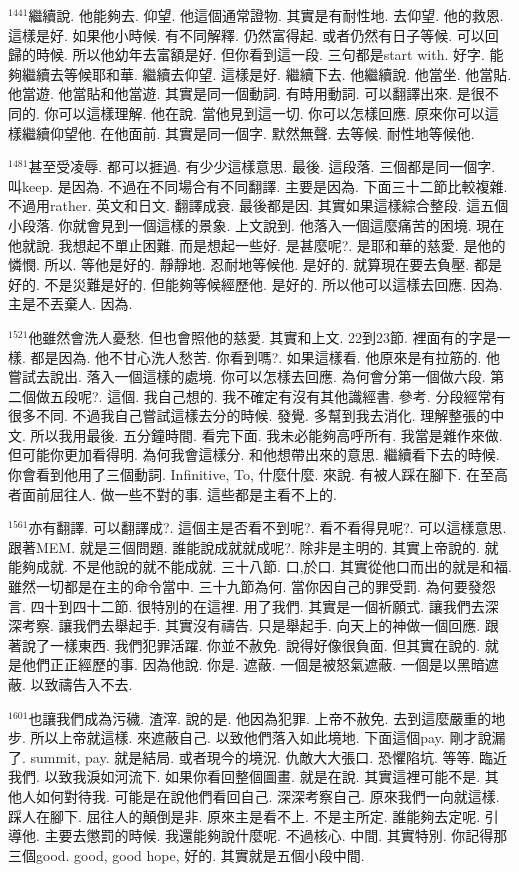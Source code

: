 \documentclass{book}
\begin{document}
$^{1441}$繼續說.
他能夠去.
仰望.
他這個通常證物.
其實是有耐性地.
去仰望.
他的救恩.
這樣是好.
如果他小時候.
有不同解釋.
仍然富得起.
或者仍然有日子等候.
可以回歸的時候.
所以他幼年去富額是好.
但你看到這一段.
三句都是start with.
好字.
能夠繼續去等候耶和華.
繼續去仰望.
這樣是好.
繼續下去.
他繼續說.
他當坐.
他當貼.
他當遊.
他當貼和他當遊.
其實是同一個動詞.
有時用動詞.
可以翻譯出來.
是很不同的.
你可以這樣理解.
他在說.
當他見到這一切.
你可以怎樣回應.
原來你可以這樣繼續仰望他.
在他面前.
其實是同一個字.
默然無聲.
去等候.
耐性地等候他.

$^{1481}$甚至受凌辱.
都可以捱過.
有少少這樣意思.
最後.
這段落.
三個都是同一個字.
叫keep.
是因為.
不過在不同場合有不同翻譯.
主要是因為.
下面三十二節比較複雜.
不過用rather.
英文和日文.
翻譯成衰.
最後都是因.
其實如果這樣綜合整段.
這五個小段落.
你就會見到一個這樣的景象.
上文說到.
他落入一個這麼痛苦的困境.
現在他就說.
我想起不單止困難.
而是想起一些好.
是甚麼呢?.
是耶和華的慈愛.
是他的憐憫.
所以.
等他是好的.
靜靜地.
忍耐地等候他.
是好的.
就算現在要去負壓.
都是好的.
不是災難是好的.
但能夠等候經歷他.
是好的.
所以他可以這樣去回應.
因為.
主是不丟棄人.
因為.

$^{1521}$他雖然會洗人憂愁.
但也會照他的慈愛.
其實和上文.
22到23節.
裡面有的字是一樣.
都是因為.
他不甘心洗人愁苦.
你看到嗎?.
如果這樣看.
他原來是有拉筋的.
他嘗試去說出.
落入一個這樣的處境.
你可以怎樣去回應.
為何會分第一個做六段.
第二個做五段呢?.
這個.
我自己想的.
我不確定有沒有其他識經書.
參考.
分段經常有很多不同.
不過我自己嘗試這樣去分的時候.
發覺.
多幫到我去消化.
理解整張的中文.
所以我用最後.
五分鐘時間.
看完下面.
我未必能夠高呼所有.
我當是雜作來做.
但可能你更加看得明.
為何我會這樣分.
和他想帶出來的意思.
繼續看下去的時候.
你會看到他用了三個動詞.
Infinitive, To, 什麼什麼.
來說.
有被人踩在腳下.
在至高者面前屈往人.
做一些不對的事.
這些都是主看不上的.

$^{1561}$亦有翻譯.
可以翻譯成?.
這個主是否看不到呢?.
看不看得見呢?.
可以這樣意思.
跟著MEM.
就是三個問題.
誰能說成就就成呢?.
除非是主明的.
其實上帝說的.
就能夠成就.
不是他說的就不能成就.
三十八節.
口,於口.
其實從他口而出的就是和福.
雖然一切都是在主的命令當中.
三十九節為何.
當你因自己的罪受罰.
為何要發怨言.
四十到四十二節.
很特別的在這裡.
用了我們.
其實是一個祈願式.
讓我們去深深考察.
讓我們去舉起手.
其實沒有禱告.
只是舉起手.
向天上的神做一個回應.
跟著說了一樣東西.
我們犯罪活躍.
你並不赦免.
說得好像很負面.
但其實在說的.
就是他們正正經歷的事.
因為他說.
你是.
遮蔽.
一個是被怒氣遮蔽.
一個是以黑暗遮蔽.
以致禱告入不去.

$^{1601}$也讓我們成為污穢.
渣滓.
說的是.
他因為犯罪.
上帝不赦免.
去到這麼嚴重的地步.
所以上帝就這樣.
來遮蔽自己.
以致他們落入如此境地.
下面這個pay.
剛才說漏了.
summit, pay.
就是結局.
或者現今的境況.
仇敵大大張口.
恐懼陷坑.
等等.
臨近我們.
以致我淚如河流下.
如果你看回整個圖畫.
就是在說.
其實這裡可能不是.
其他人如何對待我.
可能是在說他們看回自己.
深深考察自己.
原來我們一向就這樣.
踩人在腳下.
屈往人的顛倒是非.
原來主是看不上.
不是主所定.
誰能夠去定呢.
引導他.
主要去懲罰的時候.
我還能夠說什麼呢.
不過核心.
中間.
其實特別.
你記得那三個good.
good, good hope, 好的.
其實就是五個小段中間.
\end{document}
